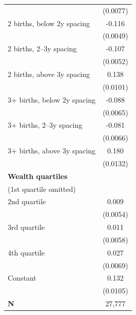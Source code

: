 {\begin{tabular}{l*{1}{c}}
                    &    (0.0077)         \\
\addlinespace
\hspace*{1em}2 births, below 2y spacing&      -0.116\sym{***}\\
                    &    (0.0049)         \\
\addlinespace
\hspace*{1em}2 births, 2–3y spacing&      -0.107\sym{***}\\
                    &    (0.0052)         \\
\addlinespace
\hspace*{1em}2 births, above 3y spacing&       0.138\sym{***}\\
                    &    (0.0101)         \\
\addlinespace
\hspace*{1em}3+ births, below 2y spacing&      -0.088\sym{***}\\
                    &    (0.0065)         \\
\addlinespace
\hspace*{1em}3+ births, 2–3y spacing&      -0.081\sym{***}\\
                    &    (0.0066)         \\
\addlinespace
\hspace*{1em}3+ births, above 3y spacing&       0.180\sym{***}\\
                    &    (0.0132)         \\
\addlinespace
\textbf{Wealth quartiles} \\ (1st quartile omitted)&                     \\
\addlinespace
\hspace*{1em}2nd quartile        &       0.009         \\
                    &    (0.0054)         \\
\addlinespace
\hspace*{1em}3rd quartile        &       0.011         \\
                    &    (0.0058)         \\
\addlinespace
\hspace*{1em}4th quartile        &       0.027\sym{***}\\
                    &    (0.0069)         \\
\addlinespace
\hspace*{1em}Constant            &       0.132\sym{***}\\
                    &    (0.0105)         \\
\midrule
\textbf{N}          &      27,777         \\
\bottomrule
\end{tabular}
}
